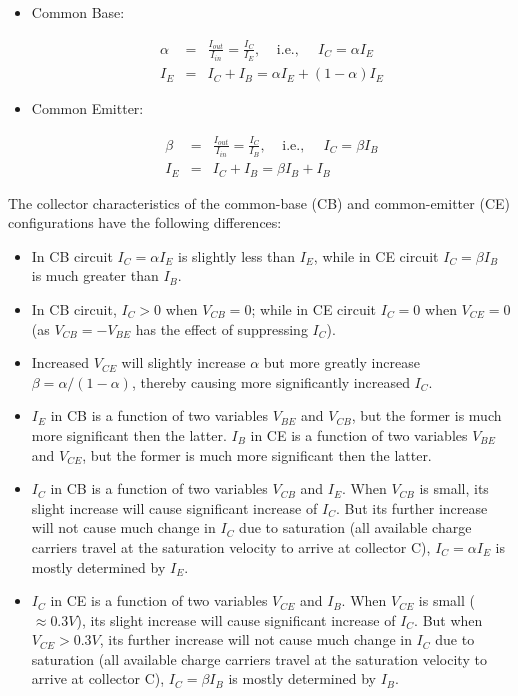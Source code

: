 \documentclass{article}
\begin{document}
\begin{itemize}
\item Common Base:

  \begin{eqnarray}
    \alpha&=&\frac{I_{out}}{I_{in}}=\frac{I_C}{I_E},
    \;\;\;\;\mbox{i.e.,}\;\;\;\;\;I_C=\alpha I_E
    \nonumber\\
    I_E&=&I_C+I_B=\alpha I_E+(1-\alpha) I_E
  \end{eqnarray}

\item Common Emitter:

  \begin{eqnarray}
    \beta&=&\frac{I_{out}}{I_{in}}=\frac{I_C}{I_B},
    \;\;\;\;\mbox{i.e.,}\;\;\;\;\;I_C=\beta I_B
    \nonumber\\
    I_E&=&I_C+I_B=\beta I_B + I_B
  \end{eqnarray}

\end{itemize}


The collector characteristics of the common-base (CB) and common-emitter 
(CE) configurations have the following differences:
\begin{itemize}
\item In CB circuit $I_C=\alpha I_E$ is slightly less than $I_E$, while 
  in CE circuit $I_C=\beta I_B$ is much greater than $I_B$.
\item In CB circuit, $I_C>0$ when $V_{CB}=0$; while in CE circuit $I_C=0$
  when $V_{CE}=0$ (as $V_{CB}=-V_{BE}$ has the effect of suppressing $I_C$).
\item Increased $V_{CE}$ will slightly increase $\alpha$ but more
  greatly increase $\beta=\alpha/(1-\alpha)$, thereby causing more 
  significantly increased $I_C$.
\item $I_E$ in CB is a function of two variables $V_{BE}$ and $V_{CB}$,
  but the former is much more significant then the latter.
  $I_B$ in CE is a function of two variables $V_{BE}$ and $V_{CE}$,
  but the former is much more significant then the latter.
\item $I_C$ in CB is a function of two variables $V_{CB}$ and $I_E$. 
  When $V_{CB}$ is small, its slight increase will cause significant increase 
  of $I_C$. But its further increase will not cause much change in $I_C$ due 
  to saturation (all available charge carriers travel at the saturation velocity
  to arrive at collector C), $I_C=\alpha I_E$ is mostly determined by $I_E$.
\item $I_C$ in CE is a function of two variables $V_{CE}$ and $I_B$. 
  When $V_{CE}$ is small ($\approx 0.3V$), its slight increase will cause 
  significant increase of $I_C$. But when $V_{CE}>0.3V$, its further increase 
  will not cause much change in $I_C$ due to saturation (all available charge 
  carriers travel at the saturation velocity to arrive at collector C), 
  $I_C=\beta I_B$ is mostly determined by $I_B$.
\end{itemize}
\end{document}

